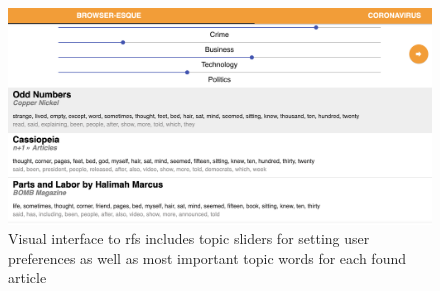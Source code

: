 \begin{figure}[!tb]
  \centering
  \includegraphics[width=\linewidth]{fig/screen_shots/screen_shot_10.png}
  \caption{Visual interface to \acrlong{rfs} includes topic sliders for setting user preferences as well as most important topic words for each found article}
  \label{fig:screen-shot}
\end{figure}